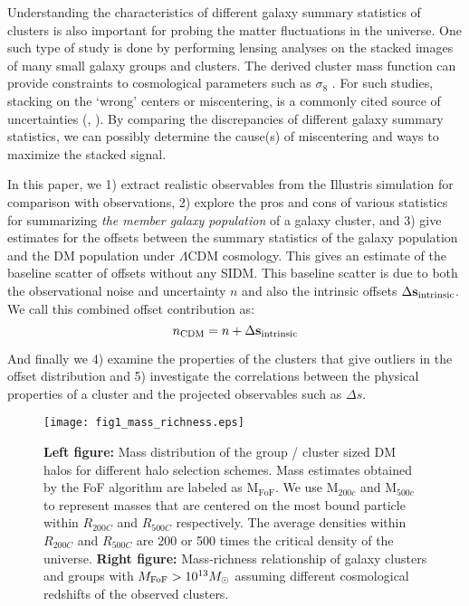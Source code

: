 Understanding the characteristics of different galaxy
summary statistics of clusters is also important for  
probing the matter fluctuations in the universe. 
One such type of study is done by performing lensing analyses on the stacked images of 
many small galaxy groups and clusters. 
The derived cluster mass function can provide constraints to cosmological
parameters such as $\sigma_8$ \citep{George2012a}. 
For such studies, stacking on the `wrong' centers or miscentering, is a commonly cited
source of uncertainties (\citealt{Johnston2007b},
\citealt{Ford2014}). By comparing the discrepancies of different galaxy
summary statistics, we can possibly determine the  
cause(s) of miscentering and ways to maximize the stacked signal. 

In this paper, we 
1) extract realistic observables from the Illustris simulation for
comparison with observations, 2) explore the pros and cons of various statistics for 
summarizing {\it the member galaxy population} of a galaxy cluster, and 3)	
give estimates for the offsets between the summary statistics of the galaxy  
population and the DM population under $\Lambda$CDM cosmology.
This gives an estimate of the baseline scatter of offsets without any SIDM.
This baseline scatter is due
to both the observational noise and uncertainty $n$ and also the intrinsic offsets 
$\Delta {\bf s}_{\rm intrinsic}$. We call this combined offset contribution as:
\begin{equation}
	n_{\rm CDM} = n + \Delta {\bf s}_{\rm intrinsic}
\end{equation}

And finally we 
4) examine the properties of the clusters that give outliers in 
the offset distribution and 5) investigate the  
correlations between the physical properties of a cluster and the projected 
observables such as $\Delta s$. 
\begin{figure*}
	\texttt{[image: fig1\_mass\_richness.eps]}
	\caption{ {\bf Left figure:} Mass distribution of the group / cluster sized 
		DM halos for different halo selection schemes. Mass estimates obtained by the
		FoF algorithm are labeled as  M$_{\text{FoF}}$.
		We use M$_{200c}$ and M$_{500c}$ to represent 
		masses that are centered on the most bound particle within $R_{200C}$ and
		$R_{500C}$ respectively. The  
		average densities within $R_{200C}$ and $R_{500C}$ are 
		200 or 500 times the critical density of the universe. 
		{\bf Right figure:} 
		Mass-richness relationship of galaxy clusters and groups with 
		$M_{\rm FoF} > 10^{13} M_{\odot}$ assuming different cosmological redshifts
		of the observed clusters. 
\label{fig:mass_richness}}
\end{figure*}

